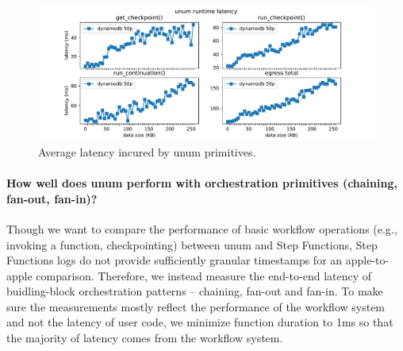 \begin{figure}[t!]
    \centering
    \includegraphics[width=\columnwidth]{figures/OpLatency.pdf}
    \caption{Average latency incured by unum primitives.}
    \label{fig:oplatency}
\end{figure}




\paragraph{How well does unum perform with orchestration primitives (chaining,
fan-out, fan-in)?}


Though we want to compare the performance of basic workflow operations (e.g.,
invoking a function, checkpointing) between unum and Step Functions, Step
Functions logs do not provide sufficiently granular timestamps for an
apple-to-apple comparison. Therefore, we instead measure the end-to-end
latency of buidling-block orchestration patterns -- chaining, fan-out and
fan-in. To make sure the measurements mostly reflect the performance of the
workflow system and not the latency of user code, we minimize function
duration to 1ms so that the majority of latency comes from the workflow
system.


